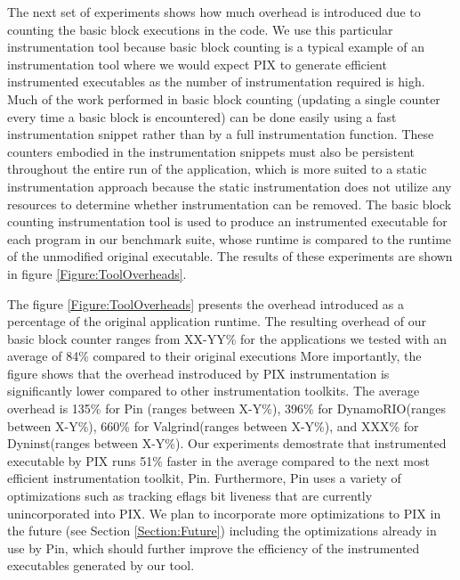 The next set of experiments shows how much overhead is introduced due to counting the
basic block executions in the code. We use this particular instrumentation tool because basic block counting
is a typical example of an instrumentation tool where we would expect PIX to generate efficient instrumented executables
as the number of instrumentation required is high. Much of the work performed in basic block counting (updating a single
counter every time a basic block is encountered) can be done easily using a fast instrumentation snippet rather than
by a full instrumentation function. These counters embodied in the instrumentation snippets must also be
persistent throughout the entire run of the application, which is more suited to a static instrumentation approach
because the static instrumentation does not utilize any resources to determine whether instrumentation can be removed.
The basic block counting instrumentation tool is used to produce an instrumented
executable for each program in our benchmark suite, whose runtime is compared to the runtime of the 
unmodified original executable. The results of these experiments are shown in figure \ref{Figure:ToolOverheads}. 

The figure \ref{Figure:ToolOverheads}
presents the overhead introduced as a percentage of the original application runtime. The
resulting overhead of our basic block counter ranges from XX-YY\% for the applications we tested with an average of 
84\% compared to their original executions More importantly, the figure shows that the overhead instroduced by PIX instrumentation is significantly 
lower compared to other instrumentation toolkits. The average overhead is 135\% for Pin (ranges between X-Y\%), 
396\% for DynamoRIO(ranges between X-Y\%), 660\% for Valgrind(ranges between X-Y\%), and XXX\% for Dyninst(ranges between X-Y\%). 
Our experiments demostrate that instrumented executable by PIX runs
51\% faster in the average compared to the next most efficient instrumentation toolkit, Pin. Furthermore,
Pin uses a variety of optimizations such as tracking eflags bit liveness \cite{luk2005pin} that are currently
unincorporated into PIX. We plan to incorporate more optimizations to PIX in the future (see Section \ref{Section:Future}) including
the optimizations already in use by Pin, which should further improve the efficiency of the instrumented
executables generated by our tool. 


